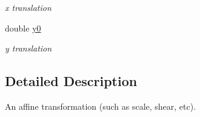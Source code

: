 \begin{DoxyCompactItemize}
\begin{DoxyCompactList}\small\item\em x translation \item\end{DoxyCompactList}\item 
\hypertarget{structt__jmatrix_ac02c1cf0fe2beab8f56c2f515477e7c8}{
double \hyperlink{structt__jmatrix_ac02c1cf0fe2beab8f56c2f515477e7c8}{y0}}
\label{structt__jmatrix_ac02c1cf0fe2beab8f56c2f515477e7c8}

\begin{DoxyCompactList}\small\item\em y translation \item\end{DoxyCompactList}\end{DoxyCompactItemize}


\subsection{Detailed Description}
An affine transformation (such as scale, shear, etc). 